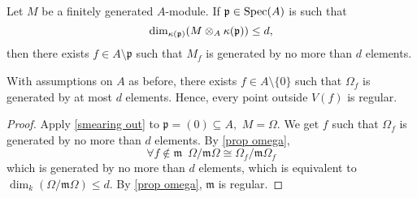 \begin{prop}
  \label{smearing out}
  Let \(M\) be a finitely generated \(A\)-module. If \(\mathfrak p \in \text{Spec}(A)\) is such that
  \[\dim_{\kappa(\mathfrak p)}(M \otimes_A \kappa(\mathfrak p)) \leq d,\]
  then there exists \(f \in A \setminus \mathfrak p\) such that \(M_f\) is generated by no more than \(d\) elements.
\end{prop}

\begin{corollary}
  With assumptions on \(A\) as before, there exists \(f \in A \setminus \{0\}\) such that \(\Omega_f\) is generated by at most \(d\) elements. Hence, every point outside \(V(f)\) is regular.
\end{corollary}
\begin{proof}
  Apply \cref{smearing out} to \(\mathfrak p = (0) \subseteq A,\) \(M = \Omega.\) We get \(f\) such that \(\Omega_f\) is generated by no more than \(d\) elements. By \cref{prop omega},
  \[\forall f \notin \mathfrak m \enspace \Omega/{\mathfrak m \Omega} \cong \Omega_f /{\mathfrak m \Omega_f}\]
  which is generated by no more than \(d\) elements, which is equivalent to
  \(\dim_k(\Omega / {\mathfrak m \Omega}) \leq d.\)
  By \cref{prop omega}, \(\mathfrak m\) is regular.
\end{proof}







